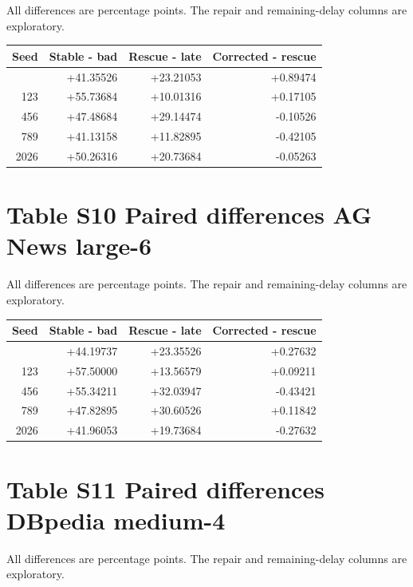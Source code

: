 \documentclass[11pt,a4paper]{article}
\begin{document}
All differences are percentage points. The repair and remaining-delay columns are exploratory.

\begin{longtable}[]{@{}rrrr@{}}
\toprule\noalign{}
Seed & Stable - bad & Rescue - late & Corrected - rescue \\
\midrule\noalign{}
\endhead
\bottomrule\noalign{}
\endlastfoot
42 & +41.35526 & +23.21053 & +0.89474 \\
123 & +55.73684 & +10.01316 & +0.17105 \\
456 & +47.48684 & +29.14474 & -0.10526 \\
789 & +41.13158 & +11.82895 & -0.42105 \\
2026 & +50.26316 & +20.73684 & -0.05263 \\
\end{longtable}


\section{Table S10 Paired differences AG News large-6}\label{table-s10-paired-differences-ag-news-large-6}

All differences are percentage points. The repair and remaining-delay columns are exploratory.

\begin{longtable}[]{@{}rrrr@{}}
\toprule\noalign{}
Seed & Stable - bad & Rescue - late & Corrected - rescue \\
\midrule\noalign{}
\endhead
\bottomrule\noalign{}
\endlastfoot
42 & +44.19737 & +23.35526 & +0.27632 \\
123 & +57.50000 & +13.56579 & +0.09211 \\
456 & +55.34211 & +32.03947 & -0.43421 \\
789 & +47.82895 & +30.60526 & +0.11842 \\
2026 & +41.96053 & +19.73684 & -0.27632 \\
\end{longtable}


\section{Table S11 Paired differences DBpedia medium-4}\label{table-s11-paired-differences-dbpedia-medium-4}

All differences are percentage points. The repair and remaining-delay columns are exploratory.
\end{document}
